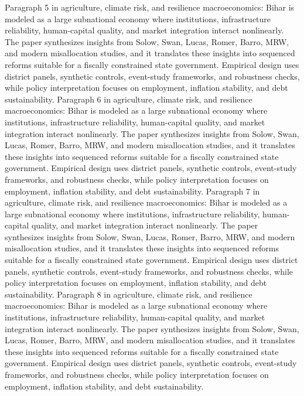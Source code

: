 \documentclass[preprint,12pt]{elsarticle}
\begin{document}
Paragraph 5 in agriculture, climate risk, and resilience macroeconomics: Bihar is modeled as a large subnational economy where institutions, infrastructure reliability, human-capital quality, and market integration interact nonlinearly. The paper synthesizes insights from Solow, Swan, Lucas, Romer, Barro, MRW, and modern misallocation studies, and it translates these insights into sequenced reforms suitable for a fiscally constrained state government. Empirical design uses district panels, synthetic controls, event-study frameworks, and robustness checks, while policy interpretation focuses on employment, inflation stability, and debt sustainability.
Paragraph 6 in agriculture, climate risk, and resilience macroeconomics: Bihar is modeled as a large subnational economy where institutions, infrastructure reliability, human-capital quality, and market integration interact nonlinearly. The paper synthesizes insights from Solow, Swan, Lucas, Romer, Barro, MRW, and modern misallocation studies, and it translates these insights into sequenced reforms suitable for a fiscally constrained state government. Empirical design uses district panels, synthetic controls, event-study frameworks, and robustness checks, while policy interpretation focuses on employment, inflation stability, and debt sustainability.
Paragraph 7 in agriculture, climate risk, and resilience macroeconomics: Bihar is modeled as a large subnational economy where institutions, infrastructure reliability, human-capital quality, and market integration interact nonlinearly. The paper synthesizes insights from Solow, Swan, Lucas, Romer, Barro, MRW, and modern misallocation studies, and it translates these insights into sequenced reforms suitable for a fiscally constrained state government. Empirical design uses district panels, synthetic controls, event-study frameworks, and robustness checks, while policy interpretation focuses on employment, inflation stability, and debt sustainability.
Paragraph 8 in agriculture, climate risk, and resilience macroeconomics: Bihar is modeled as a large subnational economy where institutions, infrastructure reliability, human-capital quality, and market integration interact nonlinearly. The paper synthesizes insights from Solow, Swan, Lucas, Romer, Barro, MRW, and modern misallocation studies, and it translates these insights into sequenced reforms suitable for a fiscally constrained state government. Empirical design uses district panels, synthetic controls, event-study frameworks, and robustness checks, while policy interpretation focuses on employment, inflation stability, and debt sustainability.
\end{document}
